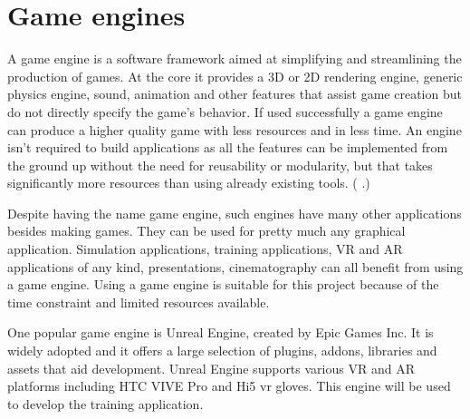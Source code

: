 \documentclass[12pt, a4paper,oneside, nocenter]{thesis}
\renewcommand{\citep}[1]{(\citeauthor{#1} \citeyear{#1}.)}
\begin{document}
\section{Game engines}
A game engine is a software framework aimed at simplifying and streamlining the production of games. At the core it provides a 3D or 2D rendering engine, generic physics engine, sound, animation and other features that assist game creation but do not directly specify the game's behavior. If used successfully a game engine can produce a higher quality game with less resources and in less time. An engine isn't required to build applications as all the features can be implemented from the ground up without the need for reusability or modularity, but that takes significantly more resources than using already existing tools. \citep{game-engines}
\par
Despite having the name game engine, such engines have many other applications besides making games. They can be used for pretty much any graphical application. Simulation applications, training applications, VR and AR applications of any kind, presentations, cinematography can all benefit from using a game engine. Using a game engine is suitable for this project because of the time constraint and limited resources available. 
\par
One popular game engine is Unreal Engine, created by Epic Games Inc. It is widely adopted and it offers a large selection of plugins, addons, libraries and assets that aid development. Unreal Engine supports various VR and AR platforms including HTC VIVE Pro and Hi5 vr gloves. This engine will be used to develop the training application.
\end{document}
